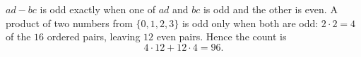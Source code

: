 $ad-bc$ is odd exactly when one of $ad$ and $bc$ is odd and the other is even. A product of two numbers from $\{0,1,2,3\}$ is odd only when both are odd: $2\cdot2=4$ of the $16$ ordered pairs, leaving $12$ even pairs. Hence the count is
\[4\cdot12+12\cdot4=\boxed{96}.\]

